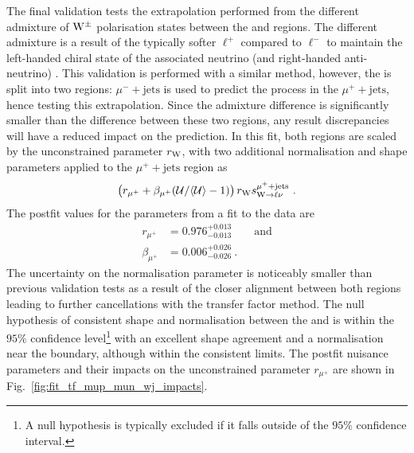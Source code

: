 The final validation tests the extrapolation performed from the different
admixture of $\mathrm{W}^{\pm}$ polarisation states between the \ellplusjets and
\metplusjets regions. The different admixture is a result of the typically
softer $\ell^+$ \pt compared to $\ell^-$ \pt to maintain the left-handed
chiral state of the associated neutrino (and right-handed anti-neutrino)
\cite{Bern:2011ie}. This validation is performed with a similar method,
however, the \muplusjets is split into two regions: $\mu^- +\mathrm{jets}$
is used to predict the \IWj process in the $\mu^+ + \mathrm{jets}$, hence testing
this extrapolation. Since the admixture difference is significantly smaller
than the difference between these two regions, any result discrepancies will
have a reduced impact on the \IWj prediction. In this fit, both regions are
scaled by the unconstrained parameter $r_\mathrm{W}$, with two additional
normalisation and shape parameters applied to the $\mu^+ +\mathrm{jets}$
region as
%
\begin{equation}
    \left(r_{\mu^+} + \beta_{\mu^+}(\mathcal{U}/\langle\mathcal{U}\rangle-1)\right)r_\mathrm{W} s_{{\mathrm{W}\rightarrow \ell\nu}}^{\mu^++\mathrm{jets}}\ .
\end{equation}
%
The postfit values for the parameters from a fit to the data are
%
\begin{align}
    r_{\mu^+} & = 0.976^{+0.013}_{-0.013}\qquad\mathrm{and}\nonumber\\
    \beta_{\mu^+} & = 0.006^{+0.026}_{-0.026}\ .
\end{align}
%
The uncertainty on the normalisation parameter is noticeably smaller than
previous validation tests as a result of the closer alignment between both
regions leading to further cancellations with the transfer factor method. The
null hypothesis of consistent shape and normalisation between the \mupplusjets
and \munplusjets is within the $95\%$ confidence level\footnote{A null
hypothesis is typically excluded if it falls outside of the $95\%$ confidence
interval.} with an excellent shape agreement and a normalisation near the
boundary, although within the consistent limits. The postfit
nuisance parameters and their impacts on the unconstrained parameter
$r_{\mu^+}$ are shown in Fig.~\ref{fig:fit_tf_mup_mun_wj_impacts}.
%
